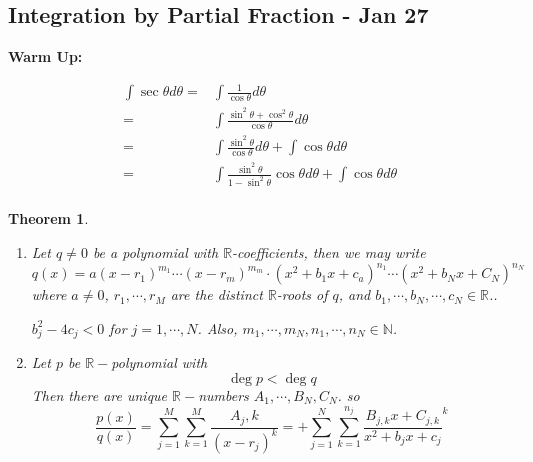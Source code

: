 \documentclass[12pt]{article}
\theoremstyle{plain}
\newtheorem{theorem}{Theorem}[subsection]
\newcommand{\mN}{{\mathbb{N}}}
\newcommand{\mR}{{\mathbb{R}}}
\begin{document}

	\newpage
	\subsection{Integration by Partial Fraction - Jan 27}

	\textbf{Warm Up: }
	
	\begin{align*}
		\int \sec\theta d\theta 
		=& \int \frac1{\cos\theta} d\theta\\
		=& \int \frac{\sin^2\theta + \cos^2\theta}{\cos \theta} d\theta\\
		=& \int\frac{\sin^2\theta}{\cos\theta} d\theta+\int\cos\theta d\theta\\
		=& \int \frac{\sin^2\theta}{1-\sin^2\theta}\cos\theta d\theta 
		+ \int \cos\theta d\theta \\
	\end{align*}

	\begin{theorem}
		$ $
		\begin{enumerate}
		\item 
		Let $q\neq 0$ be a polynomial with $\mR$-coefficients, then 
		we may write 
		\[
			q(x) = a(x-r_1)^{m_1} \cdots (x-r_m)^{m_m}\cdot
			(x^2+b_1x+c_a)^{n_1} \cdots (x^2 + b_Nx + C_N)^{n_N}
		\]
		where $a\neq 0$, $r_1, \cdots, r_M$ are the distinct $\mR$-roots
		 of $q$, and $b_1, \cdots, b_N, \cdots, c_N \in \mR$.. 

		 $b_j^2 - 4c_j < 0$ for $j=1, \cdots, N$. Also, $m_1, \cdots, m_N,
		 n_1, \cdots, n_N \in \mN$. 
		 
		\item 
		Let $p$ be $\mR-$polynomial with 
		\[
			\deg p < \deg q
		\]
		Then there are unique $\mR-$numbers $A_1, \cdots, B_N, C_N$. 
		so 
		\[
		\frac{p(x)}{q(x)} = \sum_{j=1}^M \sum_{k=1}^M \frac{A_j,k}{(x-{r_j})^k}
		= + \sum_{j=1}^N\sum_{k=1}^{n_j} \frac{B_{j,k}x + C_{j,k}}
		{x^2+b_jx+c_j}^k
	\]
		\end{enumerate}
	\end{theorem}
	
\end{document}
